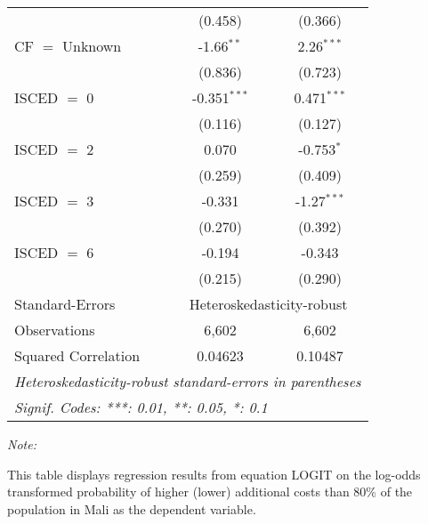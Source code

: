 \begin{table}[htbp!]
\begin{adjustbox}{width = 1\textwidth, max height = 0.95\textheight, center}
\begin{threeparttable}[b]
\begin{tabular}{lcc}
                                 & (0.458)        & (0.366)\\   
            CF $=$ Unknown       & -1.66$^{**}$   & 2.26$^{***}$\\   
                                 & (0.836)        & (0.723)\\   
            ISCED $=$ 0          & -0.351$^{***}$ & 0.471$^{***}$\\   
                                 & (0.116)        & (0.127)\\   
            ISCED $=$ 2          & 0.070          & -0.753$^{*}$\\   
                                 & (0.259)        & (0.409)\\   
            ISCED $=$ 3          & -0.331         & -1.27$^{***}$\\   
                                 & (0.270)        & (0.392)\\   
            ISCED $=$ 6          & -0.194         & -0.343\\   
                                 & (0.215)        & (0.290)\\   
            \midrule 
            Standard-Errors & \multicolumn{2}{c}{Heteroskedasticity-robust} \\ 
            Observations         & 6,602          & 6,602\\  
            Squared Correlation  & 0.04623        & 0.10487\\  
            \midrule \midrule
            \multicolumn{3}{l}{\emph{Heteroskedasticity-robust standard-errors in parentheses}}\\
            \multicolumn{3}{l}{\emph{Signif. Codes: ***: 0.01, **: 0.05, *: 0.1}}\\
         \end{tabular}
         
         \begin{tablenotes}\item \medskip \textit{Note:}
            \item This table displays regression results from equation LOGIT on the log-odds transformed probability of higher (lower) additional costs than 80\% of the population in Mali as the dependent variable. 
         \end{tablenotes}
      \end{threeparttable}
   \end{adjustbox}
\end{table}


